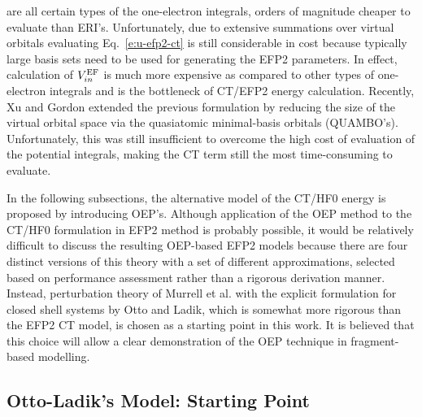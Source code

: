 are all certain types of the one\hyp{}electron integrals, orders of magnitude cheaper to
evaluate than ERI's. Unfortunately, due to extensive summations over virtual orbitals
evaluating Eq.~\eqref{e:u-efp2-ct} is still considerable in cost because typically large basis sets
need to be used for generating the EFP2 parameters. In effect, calculation of $V_{in}^{{\rm EF}}$
is much more expensive as compared to other types of one\hyp{}electron integrals
and is the bottleneck of CT/EFP2 energy calculation. Recently, Xu and Gordon
extended the previous formulation by reducing the size of the virtual orbital space
via the quasiatomic minimal\hyp{}basis orbitals (QUAMBO's).\cite{Xu.Gordon.JCP.2013} 
Unfortunately, this was still insufficient to overcome
the high cost of evaluation of the potential integrals, making the CT term still the most time\hyp{}consuming
to evaluate.

In the following subsections, the alternative model of the CT/HF0 energy is proposed
by introducing OEP's. Although application of the OEP method to the CT/HF0 formulation in EFP2 method
is probably possible, it would be relatively difficult to discuss the resulting OEP\hyp{}based
EFP2 models because there are four distinct versions of this theory
with a set of different approximations, selected based on performance assessment rather than 
a rigorous derivation manner.\cite{Li.Gordon.Jensen.JCP.2006}
Instead, perturbation theory of Murrell et al.\cite{Murrell.Randic.Williams.Longuet-Higgins.ProcRSocLondA.1965} 
with the
explicit formulation for closed shell systems by Otto and Ladik\cite{Otto.Ladik.ChemPhys.1975},
which is somewhat more rigorous than the EFP2 CT model,
is chosen as a starting point in this work. 
It is believed that this choice will allow a clear demonstration 
of the OEP technique in fragment\hyp{}based modelling.


\subsection{\label{ss:3.2.OL} Otto-Ladik's Model: Starting Point}

